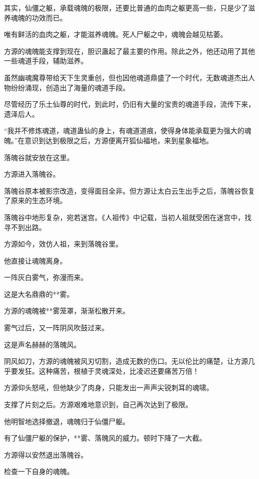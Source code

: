 
\begin{this_body}

其实，仙僵之躯，承载魂魄的极限，还要比普通的血肉之躯更高一些，只是少了滋养魂魄的功效而已。

唯有鲜活的血肉之躯，才能滋养魂魄。死人尸躯之中，魂魄会越见枯萎。

方源的魂魄能支撑到现在，胆识蛊起了最主要的作用。除此之外，他还动用了其他一些魂道手段，辅助滋养。

虽然幽魂魔尊带给天下生灵重创，但也因他魂道鼎盛了一个时代，无数魂道杰出人物纷纷涌现，创造出了海量的魂道手段。

尽管经历了乐土仙尊的时代，到此时，仍旧有大量的宝贵的魂道手段，流传下来，遗泽后人。

“我并不修炼魂道，魂道蛊仙的身上，有魂道道痕，使得身体能承载更为强大的魂魄。”在意识到达到极限之后，方源便离开狐仙福地，来到星象福地。

落魄谷就安放在这里。

方源进入落魄谷。

落魄谷原本被影宗改造，变得面目全非。但方源让太白云生出手之后，落魄谷恢复了原来的生态环境。

落魄谷中地形复杂，宛若迷宫。《人祖传》中记载，当初人祖就受困在迷宫中，找寻不到出路。

方源如今，效仿人祖，来到落魄谷里。

他直接让魂魄离身。

一阵灰白雾气，弥漫而来。

这是大名鼎鼎的**雾。

方源的魂魄被**雾笼罩，渐渐松散开来。

雾气过后，又一阵阴风吹鼓过来。

这是声名赫赫的落魄风。

阴风如刀，方源的魂魄被风刃切割，造成无数的伤口。无以伦比的痛楚，让方源几乎要发狂。这种痛苦，根植于灵魂深处，比凌迟还要痛苦万倍！

方源仰头怒吼，但他缺少了肉身，只能发出一声声尖锐刺耳的魂啸。

支撑了片刻之后。方源艰难地意识到，自己再次达到了极限。

他明智地选择撤退，魂魄归于仙僵尸躯。

有了仙僵尸躯的保护，**雾、落魄风的威力。顿时下降了一大截。

方源得以安然退出落魄谷。

检查一下自身的魂魄。


\end{this_body}
